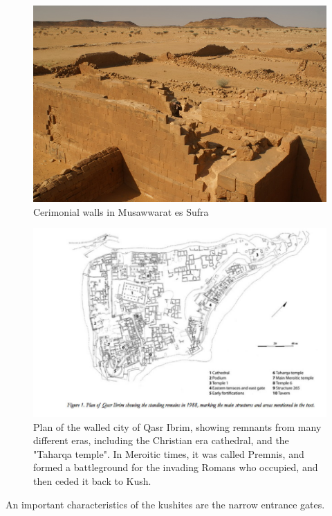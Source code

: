 \documentclass[a4paper,12pt]{scrreprt}
\begin{document}
\begin{figure}[H]
	\centering
	\includegraphics[width=\textwidth]{img/walls_gates/cermonial_wall}
	\caption{Cerimonial walls in Musawwarat es Sufra}
\end{figure}

\begin{figure}[H]
	\centering
	\includegraphics[width=\textwidth]{img/walls_gates/qasr_ibrim_walled_city}
	\caption{Plan of the walled city of Qasr Ibrim, showing remnants from many different eras, including the Christian era cathedral, and the "Taharqa temple". In Meroitic times, it was called Premnis, and formed a battleground for the invading Romans who occupied, and then ceded it back to Kush.}
\end{figure}

An important characteristics of the kushites are the narrow entrance gates.
\end{document}
